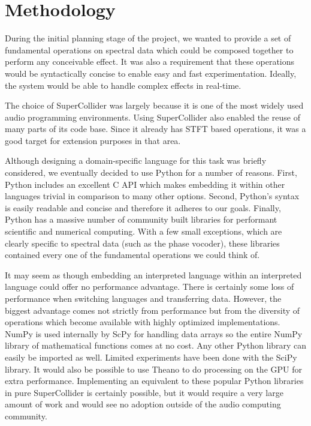 \documentclass{article}
\begin{document}
\section{Methodology}\label{sec:methodology}

During the initial planning stage of the project, we wanted to provide a set of fundamental
operations on spectral data which could be composed together to perform any conceivable effect. It
was also a requirement that these operations would be syntactically concise to enable easy and fast
experimentation. Ideally, the system would be able to handle complex effects in real-time.

The choice of SuperCollider was largely because it is one of the most widely used audio programming
environments. Using SuperCollider also enabled the reuse of many parts of its code base. Since it
already has STFT based operations, it was a good target for extension purposes in that area.

Although designing a domain-specific language for this task was briefly considered, we eventually
decided to use Python for a number of reasons. First, Python includes an excellent C API which
makes embedding it within other languages trivial in comparison to many other options. Second,
Python's syntax is easily readable and concise and therefore it adheres to our goals.  Finally,
Python has a massive number of community built libraries for performant scientific and numerical
computing. With a few small exceptions, which are clearly specific to spectral data (such as the
phase vocoder), these libraries contained every one of the fundamental operations we could think
of.

It may seem as though embedding an interpreted language within an interpreted language could offer
no performance advantage. There is certainly some loss of performance when switching languages and
transferring data. However, the biggest advantage comes not strictly from performance but from the
diversity of operations which become available with highly optimized implementations. NumPy is used
internally by ScPy for handling data arrays so the entire NumPy library of mathematical functions
comes at no cost. Any other Python library can easily be imported as well. Limited experiments
have been done with the SciPy library. It would also be possible to use Theano to do processing on
the GPU for extra performance. Implementing an equivalent to these popular Python libraries in pure
SuperCollider is certainly possible, but it would require a very large amount of work and would see
no adoption outside of the audio computing community.
\end{document}
